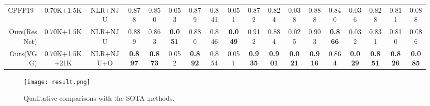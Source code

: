 \documentclass[journal]{IEEEtran}
\begin{document}
\begin{table*}[t]
{\begin{tabular}{r|cc|ccc|ccc|ccc|ccc|ccc}
    CPFP19~\cite{zhao2019contrast} & \multicolumn{1}{c}{0.70K+1.5K} & NLR+NJU & \multicolumn{1}{c}{0.878} & \multicolumn{1}{c}{0.850} & 0.053 & \multicolumn{1}{c}{0.879} & \multicolumn{1}{c}{0.841} & 0.051 & \multicolumn{1}{c}{0.872} & \multicolumn{1}{c}{0.824} & 0.038 & \multicolumn{1}{c}{0.888} & \multicolumn{1}{c}{0.840} & 0.036 & \multicolumn{1}{c}{0.828} & 0.811 & 0.088 \\
    \rowcolor{mygray}
    Ours(ResNet) & {0.70K+1.5K} & NLR+NJU & {0.889} & {0.863} & \textbf{0.051} & {0.880} & {0.846} & \textbf{0.049} & {0.912} & {0.884} & 0.025 & {0.903} & {\textbf{0.866}} & 0.032 & {0.831} & 0.810 & 0.086 \\
    Ours(VGG) & \multicolumn{1}{c}{0.70K+1.5K+21K} & NLR+NJU+O & \multicolumn{1}{c}{\textbf{0.897}} & \multicolumn{1}{c}{\textbf{0.873}} & 0.052 & \multicolumn{1}{c}{\textbf{0.892}} & \multicolumn{1}{c}{0.854} & 0.051 & \multicolumn{1}{c}{\textbf{0.935}} & \multicolumn{1}{c}{\textbf{0.901}} & \textbf{0.021} & \multicolumn{1}{c}{\textbf{0.916}} & \multicolumn{1}{c}{0.864} & \textbf{0.029} & \multicolumn{1}{c}{\textbf{0.851}} & \textbf{0.826} & \textbf{0.085} \\
\toprule[1pt]
    \end{tabular}}
\label{table:All}
\end{table*}

\begin{figure*}\begin{center}
\texttt{[image: result.png]}
\end{center}
   \caption{Qualitative comparisons with the SOTA methods.}
\label{fig:result}
\end{figure*}
\end{document}
